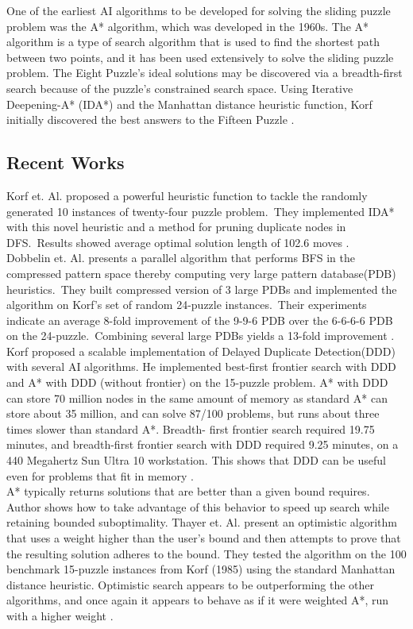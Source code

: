 \documentclass[12pt]{article}
\begin{document}
One of the earliest AI algorithms to be developed for solving the sliding puzzle problem was the A* algorithm, which was developed in the 1960s. The A* algorithm is a type of search algorithm that is used to find the shortest path between two points, and it has been used extensively to solve the sliding puzzle problem.
The Eight Puzzle's ideal solutions may be discovered via a breadth-first search because of the puzzle's constrained search space. Using Iterative Deepening-A* (IDA*) and the Manhattan distance heuristic function, Korf initially discovered the best answers to the Fifteen Puzzle \cite{b0}.

\subsection{Recent Works}
Korf et. Al. proposed a powerful heuristic function to tackle the randomly generated 10 instances of twenty-four puzzle problem. They implemented IDA* with this novel heuristic and a method for pruning duplicate nodes in DFS. Results showed average optimal solution length of 102.6 moves \cite{b1}. \\

Dobbelin et. Al. presents a parallel algorithm that performs BFS in the compressed pattern space thereby computing very large pattern database(PDB) heuristics. They built compressed version of 3 large PDBs and implemented the algorithm on Korf’s set of random 24-puzzle instances. Their experiments indicate an average 8-fold improvement of the 9-9-6 PDB over the 6-6-6-6 PDB on the 24-puzzle. Combining several large PDBs yields a 13-fold improvement \cite{b2}. \\

Korf proposed a scalable implementation of Delayed Duplicate Detection(DDD) with several AI algorithms. He implemented best-first frontier search with DDD and A* with DDD (without frontier) on the 15-puzzle problem. A* with DDD can store 70 million nodes in the same amount of memory as standard A* can store about 35 million, and can solve 87/100 problems, but runs about three times slower than standard A*. Breadth- first frontier search required 19.75 minutes, and breadth-first frontier search with DDD required 9.25 minutes, on a 440 Megahertz Sun Ultra 10 workstation. This shows that DDD can be useful even for problems that fit in memory \cite{b3}. \\

A* typically returns solutions that are better than a given bound requires. Author shows how to take advantage of this behavior to speed up search while retaining bounded suboptimality. Thayer et. Al. present an optimistic algorithm that uses a weight higher than the user’s bound and then attempts to prove that the resulting solution adheres to the bound. They tested the algorithm on the 100 benchmark 15-puzzle instances from Korf (1985) using the standard Manhattan distance heuristic. Optimistic search appears to be outperforming the other algorithms, and once again it appears to behave as if it were weighted A*, run with a higher weight \cite{b4}. \\ 
\end{document}
